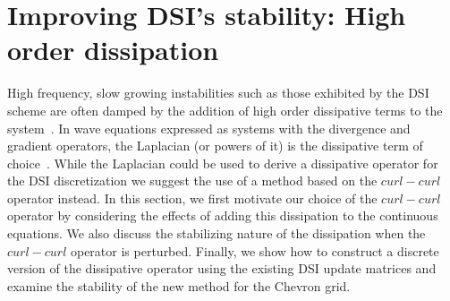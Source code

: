 \documentclass[12pt]{article}
\begin{document}




\section{Improving DSI's stability: High order dissipation}
High frequency, slow growing instabilities such as those exhibited by
the DSI scheme are often damped by the addition of high order
dissipative terms to the system~\cite{kbook}.  In wave equations
expressed as systems with the divergence and gradient operators, the
Laplacian (or powers of it) is the dissipative term of
choice~\cite{kbook}.  While the Laplacian could be used to derive a
dissipative operator for the DSI discretization we suggest the use of
a method based on the $curl-curl$ operator instead.  In this section,
we first motivate our choice of the $curl-curl$ operator by
considering the effects of adding this dissipation to the continuous
equations.  We also discuss the stabilizing nature of the dissipation
when the $curl-curl$ operator is perturbed.  Finally, we show how to
construct a discrete version of the dissipative operator using the
existing DSI update matrices and examine the stability of the new
method for the Chevron grid.
\end{document}
